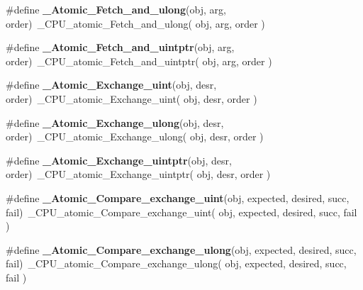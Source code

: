 \begin{DoxyCompactItemize}
\item 
\mbox{\label{group__RTEMSScoreAtomic_gac49c2eea32a89689cb9e4ea4b7fa7b1b}} 
\#define {\bfseries \+\_\+\+Atomic\+\_\+\+Fetch\+\_\+and\+\_\+ulong}(obj,  arg,  order)~\+\_\+\+C\+P\+U\+\_\+atomic\+\_\+\+Fetch\+\_\+and\+\_\+ulong( obj, arg, order )
\item 
\mbox{\label{group__RTEMSScoreAtomic_ga7c4aa3edf36f9ead947e993a721102cb}} 
\#define {\bfseries \+\_\+\+Atomic\+\_\+\+Fetch\+\_\+and\+\_\+uintptr}(obj,  arg,  order)~\+\_\+\+C\+P\+U\+\_\+atomic\+\_\+\+Fetch\+\_\+and\+\_\+uintptr( obj, arg, order )
\item 
\mbox{\label{group__RTEMSScoreAtomic_ga73de401a5b02f74f372f64e37b0972e2}} 
\#define {\bfseries \+\_\+\+Atomic\+\_\+\+Exchange\+\_\+uint}(obj,  desr,  order)~\+\_\+\+C\+P\+U\+\_\+atomic\+\_\+\+Exchange\+\_\+uint( obj, desr, order )
\item 
\mbox{\label{group__RTEMSScoreAtomic_gaa79e98685d834eba04c47c364ee11fde}} 
\#define {\bfseries \+\_\+\+Atomic\+\_\+\+Exchange\+\_\+ulong}(obj,  desr,  order)~\+\_\+\+C\+P\+U\+\_\+atomic\+\_\+\+Exchange\+\_\+ulong( obj, desr, order )
\item 
\mbox{\label{group__RTEMSScoreAtomic_ga98e25d0d1d9140904b6e6417e87bac12}} 
\#define {\bfseries \+\_\+\+Atomic\+\_\+\+Exchange\+\_\+uintptr}(obj,  desr,  order)~\+\_\+\+C\+P\+U\+\_\+atomic\+\_\+\+Exchange\+\_\+uintptr( obj, desr, order )
\item 
\mbox{\label{group__RTEMSScoreAtomic_gaeae96f7dbfcae7d05f5d77d5f0a8d693}} 
\#define {\bfseries \+\_\+\+Atomic\+\_\+\+Compare\+\_\+exchange\+\_\+uint}(obj,  expected,  desired,  succ,  fail)~\+\_\+\+C\+P\+U\+\_\+atomic\+\_\+\+Compare\+\_\+exchange\+\_\+uint( obj, expected, desired, succ, fail )
\item 
\mbox{\label{group__RTEMSScoreAtomic_gacd460cf51fbaf24cc4932870ec3510fa}} 
\#define {\bfseries \+\_\+\+Atomic\+\_\+\+Compare\+\_\+exchange\+\_\+ulong}(obj,  expected,  desired,  succ,  fail)~\+\_\+\+C\+P\+U\+\_\+atomic\+\_\+\+Compare\+\_\+exchange\+\_\+ulong( obj, expected, desired, succ, fail )

\end{DoxyCompactItemize}
